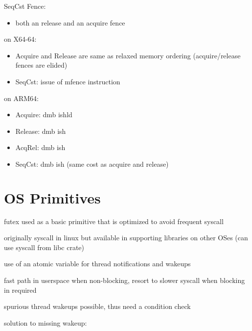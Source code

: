 \documentclass[8pt]{extarticle}
\begin{document}
\begin{multicols*}{2}
    SeqCst Fence:
    \begin{itemize}
      \item both an release and an acquire fence
    \end{itemize}  

    on X64-64:
    \begin{itemize}
    \item Acquire and Release are same as relaxed memory ordering (acquire/release fences are elided)
    \item SeqCst: issue of mfence instruction
    \end{itemize}
  
    on ARM64:
    \begin{itemize}
    \item Acquire: dmb ishld
    \item Release: dmb ish
    \item AcqRel: dmb ish
    \item SeqCst: dmb ish (same cost as acquire and release)
    \end{itemize}

    \vfill\null
    \columnbreak
        
    \section{OS Primitives}

    futex used as a basic primitive that is optimized to avoid frequent syscall

    originally syscall in linux but available in supporting libraries on other OSes (can use syscall from libc crate)

    use of an atomic variable for thread notifications and wakeups

    fast path in userspace when non-blocking, resort to slower syscall when blocking in required

    spurious thread wakeups possible, thus need a condition check

    solution to missing wakeup:


\end{multicols*}
\end{document}
